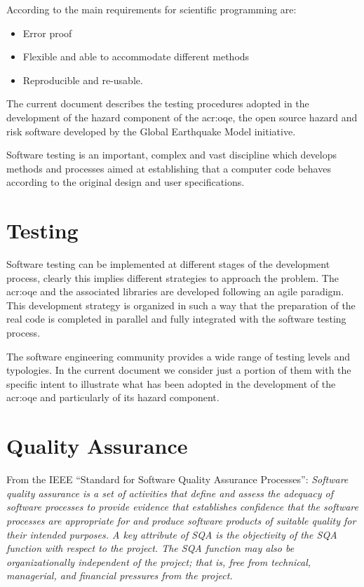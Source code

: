 According to \textcite{berkes2012} the main requirements for 
scientific programming are:
\begin{itemize}
\item Error proof
\item Flexible and able to accommodate different methods
\item Reproducible and re-usable. 
\end{itemize}

The current document describes the testing procedures adopted in 
the development of the hazard component of the \gls{acr:oqe}, the 
open source hazard and risk software developed by the Global 
Earthquake Model initiative.

Software testing \parencite{myers2012} is an important, complex and 
vast discipline which develops methods and processes aimed at 
establishing that a computer code behaves according to the original 
design and user specifications. 
 

%
\section{Testing}
Software testing can be implemented at different stages of the development 
process, clearly this implies different strategies to approach the problem.
%
The \gls{acr:oqe} and the associated libraries are developed following an 
agile paradigm. This development strategy is organized in such a way that 
the preparation of the real code is completed in parallel and fully 
integrated with the software testing process.

The software engineering community provides a wide range of testing levels
and typologies. In the current document we consider just a portion of them
with the specific intent to illustrate what has been adopted in the 
development of the \gls{acr:oqe} and particularly of its hazard component.
%
\section{Quality Assurance}
From the IEEE ``Standard for Software Quality Assurance Processes'':
\emph{Software quality assurance is a set of activities that define and 
assess the adequacy of software processes to provide evidence that establishes 
confidence that the software processes are appropriate for and produce 
software products of suitable quality for their intended purposes. 
A key attribute of SQA is the objectivity of the SQA function with 
respect to the project. The SQA function may also be organizationally 
independent of the project; that is, free from technical, managerial, 
and financial pressures from the project.}
%
